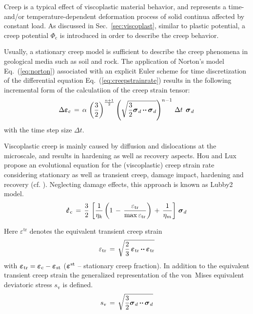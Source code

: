 Creep is a typical effect of viscoplastic material behavior, and represents a time- and/or temperature-dependent deformation process of solid continua affected by constant load. As discussed in Sec.~\ref{sec:viscoplast}, similar to plastic potential, a creep potential $\Phi_{\mathrm{c}}$ is introduced in order to describe the creep behavior.

Usually, a stationary creep model is sufficient to describe the creep phenomena in geological media such as soil and rock. The application of Norton's model Eq.~(\ref{eq:norton}) associated with an explicit Euler scheme for time discretization of the differential equation Eq.~(\ref{eq:creepstrainrate}) results in the following incremental form of the calculatiion of the creep strain tensor:
%
\begin{equation}
\Delta \mbox{${\mbox{\boldmath${\varepsilon}$\unboldmath}}_{\:\!\mathrm c}$}\,=\,
\alpha\,\left(\frac{3}{2}\right)^{\frac{n+1}{2}}
\left(\sqrt{\frac{\textstyle{\textstyle{3}}}{\textstyle{\textstyle{2}}}\mbox{${\mbox{\boldmath${\sigma}$\unboldmath}}_{\:\!d}$}\mbox{\,${\mbox{\boldmath$\cdot\cdot$\unboldmath}}$\,}\mbox{${\mbox{\boldmath${\sigma}$\unboldmath}}_{\:\!d}$}}\right)^{n-1}\,
\Delta t \,\;
\mbox{${\mbox{\boldmath${\sigma}$\unboldmath}}_{\:\!d}$}
\end{equation}
with the time step size $ \Delta t$.

Viscoplastic creep is mainly caused by diffusion and dislocations at the microscale, and results in hardening as well as recovery aspects. Hou and Lux propose an evolutional equation for the (viscoplastic) creep strain rate considering stationary as well as transient creep, damage impact, hardening and recovery (cf. \cite{Hou:1997,Hou:2002,HL:1998}). Neglecting damage effects, this approach is known as Lubby2 model.
\begin{equation}
\miu{\varepsilon}{\mathrm{c}}{\dot}\,=\,
\frac{3}{2}\,
\left[
\frac{1}{\eta_k}
\left(
1\,-\,
\frac{\varepsilon_{\mathrm{tr}}}{\mathrm{max}\,\varepsilon_{\mathrm{tr}}}
\right)
\,+\,\frac{1}{\eta_m}
\right]
\,\miu{\sigma}{d}{}
\label{Mc_lubby2_ec}
\end{equation}

Here $\varepsilon^{\mathrm{tr}}$ denotes the equivalent transient creep strain
\begin{equation}
\varepsilon_{\mathrm{tr}}\,=\,
\sqrt{\frac{2}{3}\,\mbox{${\mbox{\boldmath${\varepsilon}$\unboldmath}}_{\:\!\mathrm{tr}}$}\mbox{\,${\mbox{\boldmath$\cdot\cdot$\unboldmath}}$\,}\mbox{${\mbox{\boldmath${\varepsilon}$\unboldmath}}_{\:\!\mathrm{tr}}$}}
\end{equation}
with $\mbox{${\mbox{\boldmath${\varepsilon}$\unboldmath}}_{\:\!\mathrm{tr}}$}=\mbox{${\mbox{\boldmath${\varepsilon}$\unboldmath}}_{\:\!\mathrm{c}}$}-\mbox{${\mbox{\boldmath${\varepsilon}$\unboldmath}}_{\:\!\mathrm{st}}$}$ ($\mbox{${\mbox{\boldmath${\varepsilon}$\unboldmath}}^{\:\!\mathrm{st}}$}$ -- stationary creep fraction). In addition to the equivalent transient creep strain the generalized representation of the von~Mises equivalent deviatoric stress $s_{\mathrm{v}}$ is defined.
\begin{equation}
s_{\mathrm{v}}\,=\,\sqrt{\frac{\textstyle{\textstyle{3}}}{\textstyle{\textstyle{2}}}\mbox{${\mbox{\boldmath${\sigma}$\unboldmath}}_{\:\!d}$}\mbox{\,${\mbox{\boldmath$\cdot\cdot$\unboldmath}}$\,}\mbox{${\mbox{\boldmath${\sigma}$\unboldmath}}_{\:\!d}$}}
\end{equation}

